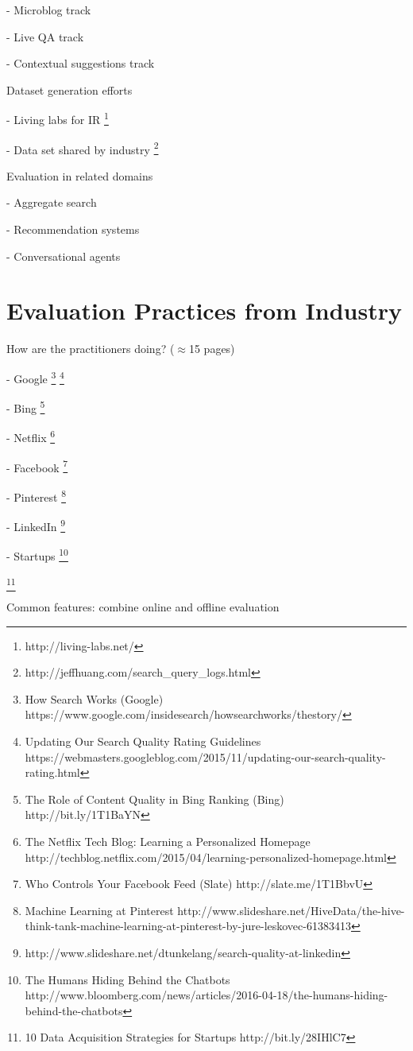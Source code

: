 \documentclass[openany]{now} %
\newcommand{\newpar}{\bigskip\noindent}
\begin{document}
- Microblog track

- Live QA track

- Contextual suggestions track

\newpar
Dataset generation efforts

- Living labs for IR \footnote{http://living-labs.net/}

- Data set shared by industry \footnote{http://jeffhuang.com/search\_query\_logs.html}

\newpar
Evaluation in related domains

- Aggregate search \cite{Zhou:2013}

- Recommendation systems \cite{gunawardana2015evaluating}

- Conversational agents

\section{Evaluation Practices from Industry}

How are the practitioners doing? (\ensuremath{\approx}15 pages)

- Google \footnote{How Search Works (Google) https://www.google.com/insidesearch/howsearchworks/thestory/} \footnote{Updating Our Search Quality Rating Guidelines
	 https://webmasters.googleblog.com/2015/11/updating-our-search-quality-rating.html}

- Bing \footnote{The Role of Content Quality in Bing Ranking (Bing)
	 http://bit.ly/1T1BaYN}

- Netflix \cite{Gomez-Uribe2015}  \footnote{The Netflix Tech Blog: Learning a Personalized Homepage
	http://techblog.netflix.com/2015/04/learning-personalized-homepage.html}

- Facebook \footnote{Who Controls Your Facebook Feed (Slate) http://slate.me/1T1BbvU}

- Pinterest \footnote{Machine Learning at Pinterest http://www.slideshare.net/HiveData/the-hive-think-tank-machine-learning-at-pinterest-by-jure-leskovec-61383413}

- LinkedIn \footnote{http://www.slideshare.net/dtunkelang/search-quality-at-linkedin}

- Startups \footnote{The Humans Hiding Behind the Chatbots http://www.bloomberg.com/news/articles/2016-04-18/the-humans-hiding-behind-the-chatbots}

\footnote{10 Data Acquisition Strategies for Startups http://bit.ly/28IHlC7}

\newpar
Common features: combine online and offline evaluation
\end{document}

